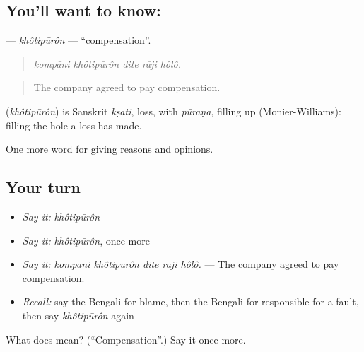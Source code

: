 \subsection*{You'll want to know: }
\textbf{} — \emph{khôtipūrôn} — \textquotedblleft{}compensation\textquotedblright{}.

\begin{quote}
    
\end{quote}

\begin{quote}
\emph{kompāni khôtipūrôn dite rāji hôlô.}
\end{quote}

\begin{quote}
The company agreed to pay compensation.
\end{quote}

\begin{cousinweb}
\textbf{} (\emph{khôtipūrôn}) is Sanskrit \emph{kṣati}, loss, with \emph{pūraṇa}, filling up (Monier-Williams): filling the hole a loss has made.
\end{cousinweb}

\begin{grammarlens}[title={What you've built}]
One more word for giving reasons and opinions.
\end{grammarlens}

\subsection*{Your turn}
\begin{itemize}
\raggedright
  \item \emph{Say it:} \emph{khôtipūrôn}
  \item \emph{Say it:} \emph{khôtipūrôn}, once more
  \item \emph{Say it:} \emph{kompāni khôtipūrôn dite rāji hôlô.} — The company agreed to pay compensation.
  \item \emph{Recall:} say the Bengali for blame, then the Bengali for responsible for a fault, then say \emph{khôtipūrôn} again
\end{itemize}

\begin{tcolorbox}[breakable,colback=teal!4,colframe=teal!35!black,title={Before you move on}]
What does  mean? (\textquotedblleft{}Compensation\textquotedblright{}.) Say it once more.
\end{tcolorbox}
